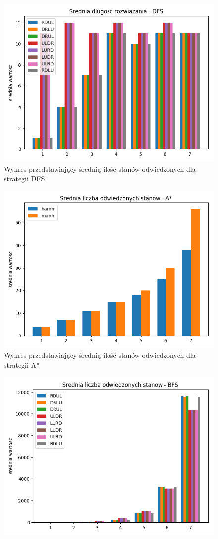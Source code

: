 \documentclass{classrep}
\begin{document}
{\begin{figure}
\includegraphics [scale=0.5]{dlugosc_DFS}
\caption{Wykres przedstawiający średnią ilość stanów odwiedzonych dla strategii DFS}
\end{figure}
\begin{figure}
\centering
\includegraphics [scale=0.5]{odwiedzone_AStar}
\caption{Wykres przedstawiający średnią ilość stanów odwiedzonych dla strategii A*}
\end{figure}
\begin{figure}
\centering
\includegraphics [scale=0.5]{odwiedzone_BFS}

\end{figure}}
\end{document}
